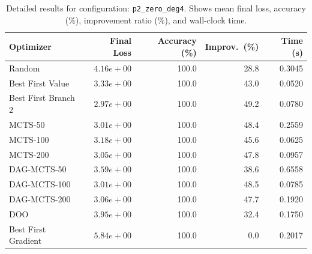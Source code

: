 \begin{table}[H]
\centering
\caption{Detailed results for configuration: \texttt{p2\_zero\_deg4}. Shows mean final loss, accuracy (\%), improvement ratio (\%), and wall-clock time.}
\label{tab:funclearn-detail-3}
\begin{tabular}{lrrrr}
\toprule
Optimizer & Final Loss & Accuracy (\%) & Improv.~(\%) & Time (s) \\
\midrule
Random & $4.16e+00$ & 100.0 & 28.8 & 0.3045 \\
\hline
Best First Value & $3.33e+00$ & 100.0 & 43.0 & 0.0520 \\
\hline
Best First Branch 2 & \textbf{$2.97e+00$} & 100.0 & 49.2 & 0.0780 \\
\hline
MCTS-50 & $3.01e+00$ & 100.0 & 48.4 & 0.2559 \\
\hline
MCTS-100 & $3.18e+00$ & 100.0 & 45.6 & 0.0625 \\
\hline
MCTS-200 & $3.05e+00$ & 100.0 & 47.8 & 0.0957 \\
\hline
DAG-MCTS-50 & $3.59e+00$ & 100.0 & 38.6 & 0.6558 \\
\hline
DAG-MCTS-100 & $3.01e+00$ & 100.0 & 48.5 & 0.0785 \\
\hline
DAG-MCTS-200 & $3.06e+00$ & 100.0 & 47.7 & 0.1920 \\
\hline
DOO & $3.95e+00$ & 100.0 & 32.4 & 0.1750 \\
\hline
Best First Gradient & $5.84e+00$ & 100.0 & 0.0 & 0.2017 \\
\bottomrule
\end{tabular}
\end{table}

